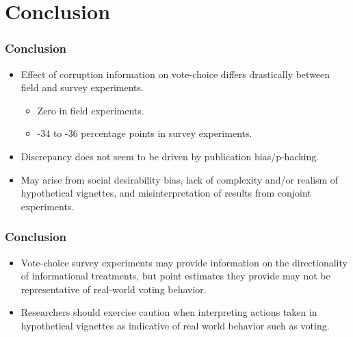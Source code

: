 \documentclass[usenames,dvipsnames]{beamer}
\begin{document}
\section{Conclusion}

\begin{frame}
\frametitle{Conclusion}
\begin{itemize}
\pause
\item Effect of corruption information on vote-choice \textcolor{Cerulean}{differs drastically} between field and survey experiments.
\begin{itemize}
\pause
\item \textcolor{Cerulean}{Zero} in field experiments.
\item \textcolor{Cerulean}{-34 to -36 percentage points} in survey experiments. 
\end{itemize}
\pause
\item Discrepancy does not seem to be driven by publication bias/p-hacking.
\pause
\item May arise from social desirability bias, lack of complexity and/or realism of hypothetical vignettes, and misinterpretation of results from conjoint experiments.

\end{itemize}
\end{frame}


\begin{frame}
\frametitle{Conclusion}
\begin{itemize}
\item Vote-choice survey experiments may provide information on the directionality of informational treatments, but point estimates they provide may not be representative of real-world voting behavior. 
\pause
\item Researchers should exercise caution when interpreting actions taken in hypothetical vignettes as indicative of real world behavior such as voting. 
\end{itemize}

\end{frame}





\end{document}
